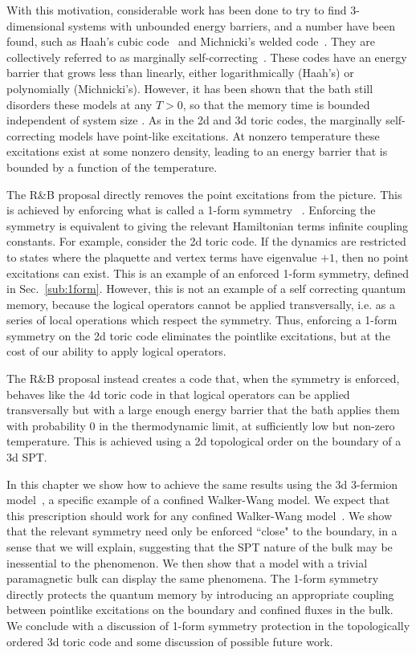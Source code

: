 With this motivation, considerable work has been done to try to find 3-dimensional systems with unbounded energy barriers, and a number have been found, such as Haah's cubic code~\cite{Haah2011Code} and Michnicki's welded code~\cite{Michnicki2014PowerLaw}. They are collectively referred to as marginally self-correcting~\cite{Siva2017Marginally}. These codes have an energy barrier that grows less than linearly, either logarithmically (Haah's) or polynomially (Michnicki's). However, it has been shown that the bath still disorders these models at any $T>0$, so that the memory time is bounded independent of system size \cite{Siva2017Marginally, PremHaahNandkishore2017}. As in the 2d and 3d toric codes, the marginally self-correcting models have point-like excitations. At nonzero temperature these excitations exist at some nonzero density, leading to an energy barrier that is bounded by a function of the temperature.

The R\&B proposal directly removes the point excitations from the picture. This is achieved by enforcing what is called a 1-form symmetry ~\cite{Gaiotto2015Generalized, Lake2018Higher}.  Enforcing the symmetry is equivalent to giving the relevant Hamiltonian terms infinite coupling constants.
For example, consider the 2d toric code. If the dynamics are restricted to states where the plaquette and vertex terms have eigenvalue $+1$, then no point excitations can exist. This is an example of an enforced 1-form symmetry, defined in Sec.~\ref{sub:1form}. However, this is not an example of a self correcting quantum memory, because the logical operators cannot be applied transversally, i.e. as a series of local operations which respect the symmetry. Thus, enforcing a 1-form symmetry on the 2d toric code eliminates the pointlike excitations, but at the cost of our ability to apply logical operators. 

The R\&B proposal \cite{RobertsBartlett2020} instead creates a code that, when the symmetry is enforced, behaves like the 4d toric code in that logical operators can be applied transversally but with a large enough energy barrier that the bath applies them with probability 0 in the thermodynamic limit, at sufficiently low but non-zero temperature. This is achieved using a 2d topological order on the boundary of a 3d SPT. 
	
In this chapter we show how to achieve the same results using the 3d 3-fermion model~\cite{Burnell2014Soluble}, a specific example of a confined Walker-Wang model. We expect that this prescription should work for any confined Walker-Wang model~\cite{WalkerWang2011, vonKeyserlingk2013SurfaceAnyons}. We show that the relevant symmetry need only be enforced ``close" to the boundary, in a sense that we will explain, suggesting that the SPT nature of the bulk may be inessential to the phenomenon. 
We then show that a model with a trivial paramagnetic bulk can display the same phenomena. The 1-form symmetry directly protects the quantum memory by introducing an appropriate coupling between pointlike excitations on the boundary and confined fluxes in the bulk. 
We conclude with a discussion of 1-form symmetry protection in the topologically ordered 3d toric code and some discussion of possible future work.

